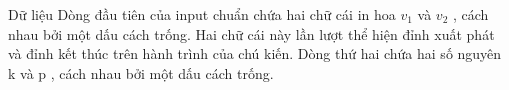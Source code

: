 Dữ liệu
Dòng đầu tiên của input chuẩn chứa hai chữ cái in hoa       $v_{1}$      và       $v_{2}$      , cách nhau bởi một dấu cách trống. Hai chữ cái này lần lượt thể hiện đỉnh xuất phát và đỉnh kết thúc trên hành trình của chú kiến. Dòng thứ hai chứa hai số nguyên       k      và       p      , cách nhau bởi một dấu cách trống.